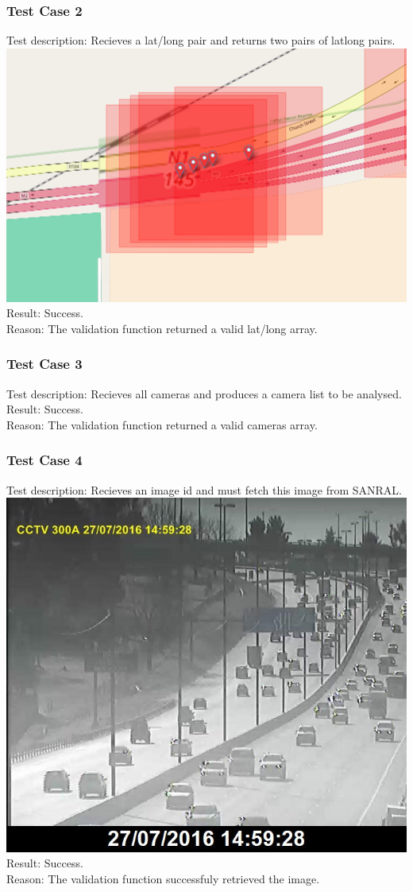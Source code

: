 \documentclass[a4paper,12pt]{article}
\begin{document}
\subsubsection{Test Case 2}
Test description: Recieves a lat/long pair and returns two pairs of latlong pairs.\\
\includegraphics[scale=0.3]{images/bound.png}\\ 
Result: Success.\\
Reason: The validation function returned a valid lat/long array.
\subsubsection{Test Case 3}
Test description: Recieves all cameras and produces a camera list to be analysed.
Result: Success.\\
Reason: The validation function returned a valid cameras array.
\subsubsection{Test Case 4}
Test description: Recieves an image id and must fetch this image from SANRAL.\\
\includegraphics[scale=0.6]{images/im11.jpg}\\
Result: Success.\\
Reason: The validation function successfuly retrieved the image.
\end{document}
